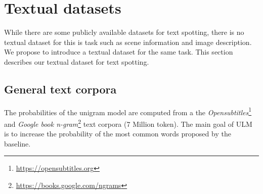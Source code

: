 \documentclass[phd,tocprelim]{cornell}
\begin{document}








\section{Textual datasets}
While there are some publicly available datasets for text spotting, there is no textual dataset for this is task such as scene information and image description. We propose to introduce a textual dataset for the same task.  This section describes our textual dataset for text spotting.   


\subsection{General text corpora}


The probabilities of the unigram model are computed from a the {\textit{Opensubtitles}}\footnote{\href{https://opensubtitles.org}{https://opensubtitles.org}} \cite{lison2016opensubtitles2016} and {\textit{Google book n-gram}}\footnote{\href{https://books.google.com/ngrams}{ https://books.google.com/ngrams}} 
 text corpora (7 Million token). The main goal of ULM is to increase the probability of the most common words proposed by the baseline. 
\end{document}
